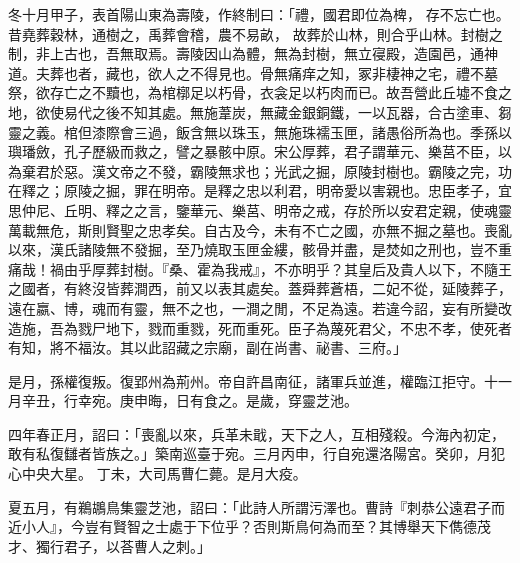 \begin{pinyinscope}
冬十月甲子，表首陽山東為壽陵，作終制曰：「禮，國君即位為椑，
存不忘亡也。
昔堯葬穀林，通樹之，禹葬會稽，農不易畝，
故葬於山林，則合乎山林。封樹之制，非上古也，吾無取焉。壽陵因山為體，無為封樹，無立寑殿，造園邑，通神道。夫葬也者，藏也，欲人之不得見也。骨無痛痒之知，冢非棲神之宅，禮不墓祭，欲存亡之不黷也，為棺槨足以朽骨，衣衾足以朽肉而已。故吾營此丘墟不食之地，欲使易代之後不知其處。無施葦炭，無藏金銀銅鐵，一以瓦器，合古塗車、芻靈之義。棺但漆際會三過，飯含無以珠玉，無施珠襦玉匣，諸愚俗所為也。季孫以璵璠斂，孔子歷級而救之，譬之暴骸中原。宋公厚葬，君子謂華元、樂莒不臣，以為棄君於惡。漢文帝之不發，霸陵無求也；光武之掘，原陵封樹也。霸陵之完，功在釋之；原陵之掘，罪在明帝。是釋之忠以利君，明帝愛以害親也。忠臣孝子，宜思仲尼、丘明、釋之之言，鑒華元、樂莒、明帝之戒，存於所以安君定親，使魂靈萬載無危，斯則賢聖之忠孝矣。自古及今，未有不亡之國，亦無不掘之墓也。喪亂以來，漢氏諸陵無不發掘，至乃燒取玉匣金縷，骸骨并盡，是焚如之刑也，豈不重痛哉！禍由乎厚葬封樹。『桑、霍為我戒』，不亦明乎？其皇后及貴人以下，不隨王之國者，有終沒皆葬澗西，前又以表其處矣。蓋舜葬蒼梧，二妃不從，延陵葬子，遠在嬴、博，魂而有靈，無不之也，一澗之閒，不足為遠。若違今詔，妄有所變改造施，吾為戮尸地下，戮而重戮，死而重死。臣子為蔑死君父，不忠不孝，使死者有知，將不福汝。其以此詔藏之宗廟，副在尚書、祕書、三府。」




是月，孫權復叛。復郢州為荊州。帝自許昌南征，諸軍兵並進，權臨江拒守。十一月辛丑，行幸宛。庚申晦，日有食之。是歲，穿靈芝池。


四年春正月，詔曰：「喪亂以來，兵革未戢，天下之人，互相殘殺。今海內初定，敢有私復讎者皆族之。」築南巡臺于宛。三月丙申，行自宛還洛陽宮。癸卯，月犯心中央大星。
丁未，大司馬曹仁薨。是月大疫。


夏五月，有鵜鶘鳥集靈芝池，詔曰：「此詩人所謂污澤也。曹詩『刺恭公遠君子而近小人』，今豈有賢智之士處于下位乎？否則斯鳥何為而至？其博舉天下儁德茂才、獨行君子，以荅曹人之刺。」



\end{pinyinscope}
